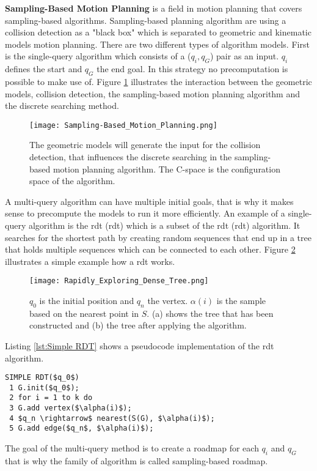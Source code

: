 \textbf{Sampling-Based Motion Planning} is a field in motion planning that covers sampling-based algorithms. Sampling-based planning algorithm are using a collision detection as a "black box" which is separated to geometric and kinematic models motion planning. There are two different types of algorithm models. First is the single-query algorithm which consists of a ($q_i,q_G$) pair as an input. $q_i$ defines the start and $q_G$ the end goal. In this strategy no precomputation is possible to make use of. Figure \ref{fig:Geometric Models Collision Detection Algorithm} illustrates the interaction between the geometric models, collision detection, the sampling-based motion planning algorithm and the discrete searching method.
\begin{figure}[H]
    \centering
    \texttt{[image: Sampling-Based\_Motion\_Planning.png]}
    \caption{The geometric models will generate the input for the collision detection, that influences the discrete searching in the sampling-based motion planning algorithm. The C-space is the configuration space of the algorithm. \cite{planning_algorithms_steven_m_lavalle}}
    \label{fig:Geometric Models Collision Detection Algorithm}
\end{figure}
A multi-query algorithm can have multiple initial goals, that is why it makes sense to precompute the models to run it more efficiently. An example of a single-query algorithm is the \acrlong{rdt} (\acrshort{rdt}) which is a subset of the \acrlong{rdt} (\acrshort{rdt}) algorithm. It searches for the shortest path by creating random sequences that end up in a tree that holds multiple sequences which can be connected to each other. Figure \ref{fig:Rapidly Exploring Dense Tree} illustrates a simple example how a \acrshort{rdt} works.
\begin{figure}[H]
    \centering
    \texttt{[image: Rapidly\_Exploring\_Dense\_Tree.png]}
    \caption{$q_0$ is the initial position and $q_n$ the vertex. $\alpha(i)$ is the sample based on the nearest point in $S$. (a) shows the tree that has been constructed and (b) the tree after applying the algorithm. \cite{planning_algorithms_steven_m_lavalle}}
    \label{fig:Rapidly Exploring Dense Tree}
\end{figure}

Listing \ref{lst:Simple RDT} shows a pseudocode implementation of the \acrshort{rdt} algorithm.
\begin{lstlisting}[mathescape=true, caption={The simple \acrshort{rdt} computes a random tree with the nearest function. \cite{planning_algorithms_steven_m_lavalle}}, label={lst:Simple RDT}]
SIMPLE RDT($q_0$)
 1 G.init($q_0$);
 2 for i = 1 to k do
 3 G.add vertex($\alpha(i)$);
 4 $q_n \rightarrow$ nearest(S(G), $\alpha(i)$);
 5 G.add edge($q_n$, $\alpha(i)$);
\end{lstlisting}
The goal of the multi-query  method is to create a roadmap for each $q_i$ and $q_G$ that is why the family of algorithm is called sampling-based roadmap. \cite{planning_algorithms_steven_m_lavalle}

